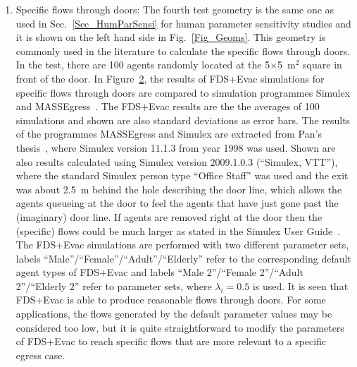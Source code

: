 \documentclass[12pt,a4paper,final,twoside]{stylevk}
\begin{document}
\begin{enumerate}
  In Figure~\ref{Fig_AssemblyResults} also shown are the results of
  the simulations for a case, where there is no corridor at all,
  i.e., there is just one 7.2~m wide exit door located at the
  wall of the room.  In this case, the agreement between the different
  evacuation programmes is much better.  The calculated specific flows
  (1/p/m) are: Simulex 1.48, Exodus 1.95, FDS+Evac 1.36
  ($\lambda_i=0.3$), and 1.79 ($\lambda_i=0.5$).

%
\begin{figure}[!tb]
  \centerline{\texttt{[image: FIGURES/AssSpace\_Results\_FDS550\_Evac221]}} 
  \caption{The comparison of FDS+Evac to buildingExodus
    and Simulex in an assembly space.}\label{Fig_AssemblyResults}
\end{figure}
%
%
%
\begin{figure}[!b]
  \centerline{\texttt{[image: FIGURES/Collect\_DoorFlow\_vs\_Width]}} 
  \caption{The specific flows through doors.}\label{Fig_DoorResults}  
\end{figure}
%

%
\item Specific flows through doors: The fourth test geometry is the
  same one as used in Sec.~\ref{Sec_HumParSensi} for human
  parameter sensitivity studies and it is shown on the left hand side
  in Fig.~\ref{Fig_Geoms}.  This geometry is commonly used in the
  literature to calculate the specific flows through doors.  In the
  test, there are 100 agents randomly located at the
  5$\times$5~$\mathrm{m^2}$ square in front of the door.  In
  Figure~\ref{Fig_DoorResults}, the results of FDS+Evac simulations
  for specific flows through doors are compared to simulation
  programmes Simulex and MASSEgress~\cite{Pan06}.  The FDS+Evac
  results are the the averages of 100 simulations and shown are also
  standard deviations as error bars. The results of the programmes
  MASSEgress and Simulex are extracted from Pan's thesis~\cite{Pan06},
  where Simulex version 11.1.3 from year 1998 was used.  Shown are
  also results calculated using Simulex version 2009.1.0.3 (``Simulex,
  VTT''), where the standard Simulex person type ``Office Staff'' was
  used and the exit was about 2.5~m behind the hole describing the
  door line, which allows the agents queueing at the door to feel the
  agents that have just gone past the (imaginary) door line.  If
  agents are removed right at the door then the (specific) flows could
  be much larger as stated in the Simulex User Guide~\cite{IES2009}.
  The FDS+Evac simulations are performed with two different parameter
  sets, labels ``Male''/``Female''/``Adult''/``Elderly'' refer to the
  corresponding default agent types of FDS+Evac and labels ``Male
  2''/``Female 2''/``Adult 2''/``Elderly 2'' refer to parameter sets,
  where $\lambda_i = 0.5$ is used.  It is seen that FDS+Evac is able
  to produce reasonable flows through doors.  For some applications,
  the flows generated by the default parameter values may be
  considered too low, but it is quite straightforward to modify the
  parameters of FDS+Evac to reach specific flows that are more
  relevant to a specific egress case.


\end{enumerate}
\end{document}
